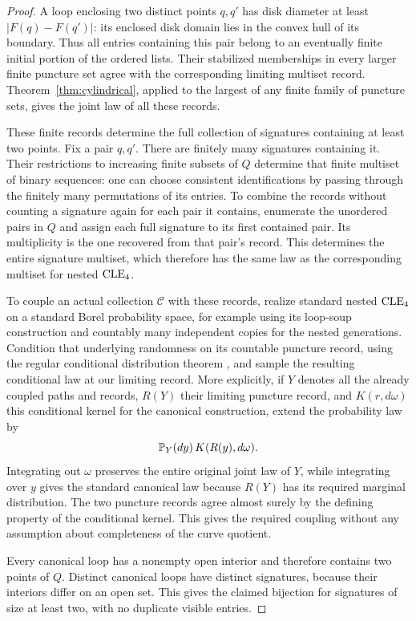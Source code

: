 \begin{proof}
A loop enclosing two distinct points $q,q'$ has disk diameter at least $|F(q)-F(q')|$: its enclosed disk domain lies in the convex hull of its boundary. Thus all entries containing this pair belong to an eventually finite initial portion of the ordered lists. Their stabilized memberships in every larger finite puncture set agree with the corresponding limiting multiset record. Theorem~\ref{thm:cylindrical}, applied to the largest of any finite family of puncture sets, gives the joint law of all these records.

These finite records determine the full collection of signatures containing at least two points. Fix a pair $q,q'$. There are finitely many signatures containing it. Their restrictions to increasing finite subsets of $Q$ determine that finite multiset of binary sequences: one can choose consistent identifications by passing through the finitely many permutations of its entries. To combine the records without counting a signature again for each pair it contains, enumerate the unordered pairs in $Q$ and assign each full signature to its first contained pair. Its multiplicity is the one recovered from that pair's record. This determines the entire signature multiset, which therefore has the same law as the corresponding multiset for nested $\mathrm{CLE}_4$.

To couple an actual collection $\mathcal C$ with these records, realize standard nested $\mathrm{CLE}_4$ on a standard Borel probability space, for example using its loop-soup construction and countably many independent copies for the nested generations. Condition that underlying randomness on its countable puncture record, using the regular conditional distribution theorem \cite[Theorems~4.1.17--4.1.18]{Durrett}, and sample the resulting conditional law at our limiting record. More explicitly, if $Y$ denotes all the already coupled paths and records, $R(Y)$ their limiting puncture record, and $K(r,d\omega)$ this conditional kernel for the canonical construction, extend the probability law by
\[
 \mathbb P_Y(dy)\,K(R(y),d\omega).
\]
Integrating out $\omega$ preserves the entire original joint law of $Y$, while integrating over $y$ gives the standard canonical law because $R(Y)$ has its required marginal distribution. The two puncture records agree almost surely by the defining property of the conditional kernel. This gives the required coupling without any assumption about completeness of the curve quotient.

Every canonical loop has a nonempty open interior and therefore contains two points of $Q$. Distinct canonical loops have distinct signatures, because their interiors differ on an open set. This gives the claimed bijection for signatures of size at least two, with no duplicate visible entries.


\end{proof}
